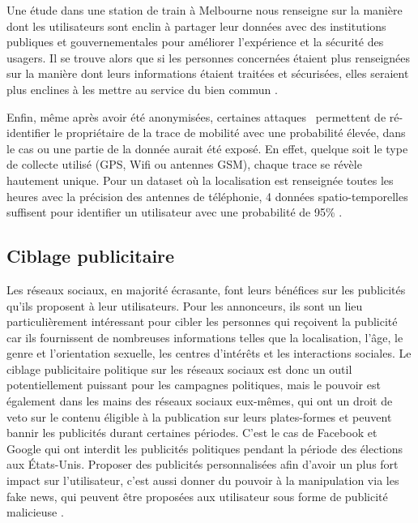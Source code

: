\documentclass[runningheads]{llncs}
\begin{document}
Une étude dans une station de train à Melbourne nous renseigne sur la manière dont les utilisateurs sont enclin à partager leur données avec des institutions publiques et gouvernementales pour améliorer l'expérience et la sécurité des usagers. Il se trouve alors que si les personnes concernées étaient plus renseignées sur la manière dont leurs informations étaient traitées et sécurisées, elles seraient plus enclines à les mettre au service du bien commun \cite{cabalquinto_it_2020}.

Enfin, même après avoir été anonymisées, certaines attaques~\cite{zhang_asynchronous_2018} permettent de ré-identifier le propriétaire de la trace de mobilité avec une probabilité élevée, dans le cas ou une partie de la donnée aurait été exposé.
En effet, quelque soit le type de collecte utilisé (GPS, Wifi ou antennes GSM), chaque trace se révèle hautement unique\cite{boutet_uniqueness_2016}. Pour un dataset où la localisation est renseignée toutes les heures avec la précision des antennes de téléphonie, 4 données spatio-temporelles suffisent pour identifier un utilisateur avec une probabilité de 95\% \cite{montjoye_unique_2013}.


\subsection{Ciblage publicitaire}

Les réseaux sociaux, en majorité écrasante, font leurs bénéfices sur les publicités qu'ils proposent à leur utilisateurs. Pour les annonceurs, ils sont un lieu particulièrement intéressant pour cibler les personnes qui reçoivent la publicité car ils fournissent de nombreuses informations telles que la localisation, l'âge, le genre et l'orientation sexuelle, les centres d'intérêts et les interactions sociales. Le ciblage publicitaire politique sur les réseaux sociaux est donc un outil potentiellement puissant pour les campagnes politiques\cite{maruyama_hybrid_2014}, mais le pouvoir est également dans les mains des réseaux sociaux eux-mêmes, qui ont un droit de veto sur le contenu éligible à la publication sur leurs plates-formes et peuvent bannir les publicités durant certaines périodes. C'est le cas de Facebook et Google qui ont interdit les publicités politiques pendant la période des élections aux États-Unis\cite{facebook_facebook_2020}. Proposer des publicités personnalisées afin d'avoir un plus fort impact sur l'utilisateur, c'est aussi donner du pouvoir à la manipulation via les fake news, qui peuvent être proposées aux utilisateur sous forme de publicité malicieuse \cite{ribeiro_microtargeting_2019}.
\end{document}
